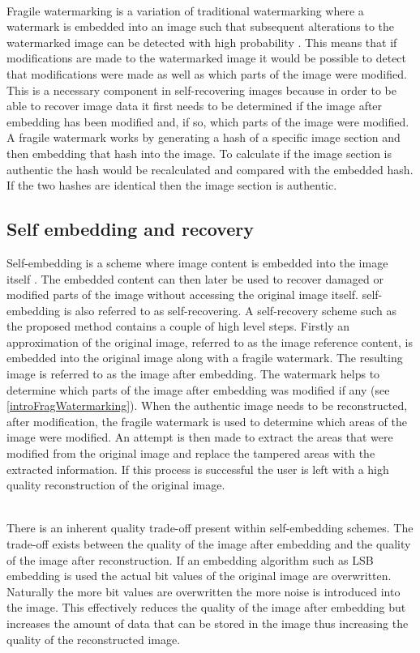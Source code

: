\documentclass[12pt]{article}
\begin{document}
\hspace{0pt} \\
Fragile watermarking is a variation of traditional watermarking where a watermark is embedded into an image such that subsequent alterations to the watermarked image can be detected with high probability \cite{lin1999review}.
This means that if modifications are made to the watermarked image it would be possible to detect that modifications were made as well as which parts of the image were modified.
This is a necessary component in self-recovering images because in order to be able to recover image data it first needs to be determined if the image after embedding has been modified and, if so, which parts of the image were modified.
A fragile watermark works by generating a hash of a specific image section and then embedding that hash into the image.
To calculate if the image section is authentic the hash would be recalculated and compared with the embedded hash.
If the two hashes are identical then the image section is authentic. 

\subsection{Self embedding and recovery}
\label{introSelfEmbedRecovery}
Self-embedding is a scheme where image content is embedded into the image itself \cite{fridrich1999images}. The embedded content can then later be used to recover damaged or modified parts of the image without accessing the original image itself.
self-embedding is also referred to as self-recovering.
A self-recovery scheme such as the proposed method contains a couple of high level steps.
Firstly an approximation of the original image, referred to as the image reference content, is embedded into the original image along with a fragile watermark.
The resulting image is referred to as the image after embedding.
The watermark helps to determine which parts of the image after embedding was modified if any (see \ref{introFragWatermarking}).
When the authentic image needs to be reconstructed, after modification, the fragile watermark is used to determine which areas of the image were modified.
An attempt is then made to extract the areas that were modified from the original image and replace the tampered areas with the extracted information.
If this process is successful the user is left with a high quality reconstruction of the original image.

\hspace{0pt} \\
There is an inherent quality trade-off present within self-embedding schemes.
The trade-off exists between the quality of the  image after embedding and the quality of the image after reconstruction.
If an embedding algorithm such as LSB embedding is used the actual bit values of the original image are overwritten.
Naturally the more bit values are overwritten the more noise is introduced into the image.
This effectively reduces the quality of the image after embedding but increases the amount of data that can be stored in the image thus increasing the quality of the reconstructed image.
\end{document}
